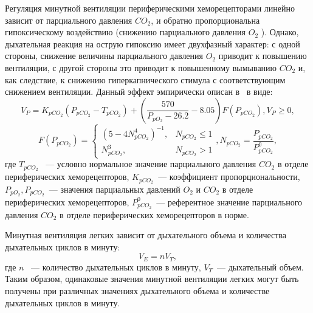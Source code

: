 Регуляция минутной вентиляции периферическими хеморецепторами линейно зависит от парциального давления \( CO_{2}\), и обратно пропорциональна гипоксическому воздействию (снижению парциального давления \( O_{2}\) ). Однако, дыхательная реакция на острую гипоксию имеет двухфазный характер: с одной стороны, снижение величины парциального давления \( O_{2}\) приводит к повышению вентиляции, с другой стороны это приводит к  повышенному вымыванию \( CO_{2}\) и, как следствие, к снижению гиперкапнического стимула с соответствующим снижением вентиляции. Данный эффект эмпирически описан в~\cite{wolf2007} в виде:   
\begin{equation}
V_{P}=K_{pCO_{2}}\left(P_{pCO_{2}}-T_{pCO_{2}} \right)+\left(\frac{570}{P_{pO_{2}}-26.2}-8.05\right)F(P_{pCO_{2}}), V_{P}\ge 0,
\end{equation}
\begin{equation}
F(P_{pCO_{2}})=\begin{cases}
\left(5-4N_{pCO_{2}}^4 \right)^{-1}, & N_{pCO_{2}}\le 1 \\
N_{pCO_{2}}^3, & N_{pCO_{2}}> 1 
\end{cases}, 
N_{pCO_{2}}=\frac{P_{pCO_{2}}}{P_{pCO_{2}}^0},
\end{equation}
\noindent где \( T_{pCO_{2}}\) ~--- условно нормальное значение парциального давления $CO_{2}$ в отделе периферических хеморецепторов, 
\( K_{pCO_{2}}\)~--- коэффициент пропорциональности, 
\( P_{pO_{2}}, P_{pCO_{2}}\)~--- значения парциальных давлений $O_{2}$ и $CO_{2}$ в отделе периферических хеморецепторов,
\( P_{pCO_{2}}^0\)~--- референтное значение парциального давления $CO_{2}$ в отделе периферических хеморецепторов в норме. 

Минутная вентиляция легких зависит от дыхательного объема и количества дыхательных циклов в минуту:
\begin{equation}
V_{E}=nV_{T},
\end{equation}
\noindent где \( n\)  ~---  количество дыхательных циклов в минуту, \( V_{T}\)~--- дыхательный объем. Таким образом, одинаковые значения минутной вентиляции легких могут быть получены при различных значениях дыхательного объема и количестве дыхательных циклов в минуту.

